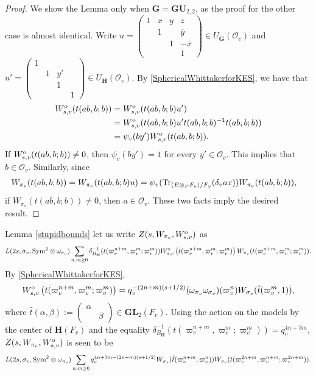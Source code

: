 \documentclass[11pt, reqno]{amsart}
\theoremstyle{plain}
\theoremstyle{definition}
\theoremstyle{remark}
\theoremstyle{plain}
\def\H{{H}}
\def\G{\mathbf{G}}
\def\H{\mathbf{H}}
\def\GU{{\mathbf{GU}}}
\def\GL{\mathbf{GL}}
\begin{document}
\begin{proof} 
We show the Lemma only when $\G = \GU_{2,2}$, as the proof for the other case is almost identical. Write $u = \left(\begin{smallmatrix}1&x &y &z \\ &1 & & \overline{y}\\ & &1&-\overline{x} \\ & & & 1\end{smallmatrix}\right) \in U_{{\G}}(\mathcal{O}_v)$ and $u' = \left(\begin{smallmatrix}1& & & \\ &1 &y' & \\ & &1& \\ & & & 1\end{smallmatrix}\right)\in U_{\H}(\mathcal{O}_v)$. By \eqref{SphericalWhittakerforKES}, we have that 
\begin{align*}
W_{s,v}^{\rm o}(t(ab,b;b)) &= W_{s,v}^{\rm o}(t(ab,b;b)u') \\ 
&= W_{s,v}^{\rm o}(t(ab,b;b)u't(ab,b;b)^{-1} t(ab,b;b)) \\ 
&= \psi_v(b y')W_{s,v}^{\rm o}(t(ab,b;b)).
\end{align*}  
If $W_{s,v}^{\rm o}(t(ab,b;b)) \ne 0$, then $\psi_v(b y')=1$ for every $y' \in \mathcal{O}_v$. This implies that $b \in \mathcal{O}_v$. Similarly, since
\begin{align*}
W_{\pi_v}(t(ab,b;b)) &= W_{\pi_v}(t(ab,b;b)u) = \psi_v({\rm Tr}_{(E \otimes_F F_v)/F_v}(\delta_v a x))W_{\pi_v}(t(ab,b;b)), 
\end{align*}  
if $W_{\pi_v}(t(ab,b;b)) \ne 0$, then $a \in \mathcal{O}_v$. These two facts imply the desired result.
\end{proof}
\noindent Lemma \ref{stupidbounds} let us write $Z(s,W_{\pi_v},W_{s,v}^{\rm o})$ as
\begin{align*} L(2s, \sigma_v, {\rm Sym}^2\otimes \omega_{\pi_v} )  \sum_{n,m \geq 0} \delta_{B_\H}^{-1}(t(\varpi_v^{n+m},\varpi_v^m;\varpi_v^m))W_{s,v}^{\rm o}\left(t(\varpi_v^{n+m},\varpi_v^m;\varpi_v^m)\right)W_{\pi_v}(t(\varpi_v^{n+m},\varpi_v^m;\varpi_v^m)).\end{align*}
By \eqref{SphericalWhittakerforKES}, 
\[W_{s,v}^{\rm o}\left(t(\varpi_v^{n+m},\varpi_v^m;\varpi_v^m)\right) = q_v^{-(2n+m)(s+1/2)} (\omega_{\pi_v}\omega_{\sigma_v})(\varpi_v^n) W_{\sigma_v}(\hat{t}(\varpi_v^m,1)),\]
where $\hat{t}(\alpha,\beta) := \left(\begin{smallmatrix} \alpha& \\ & \beta \end{smallmatrix}\right)\in \GL_2(F_v)$. Using the action on the models by the center of $\H(F_v)$ and the equality $\delta_{B_\H}^{-1}(t(\varpi_v^{n+m},\varpi_v^m;\varpi_v^m)) = q_v^{4n+3m}$,   $Z(s,W_{\pi_v},W_{s,v}^{\rm o})$ is seen to be  
\begin{align}\label{WhittakerLocalExpr} L(2s, \sigma_v, {\rm Sym}^2\otimes \omega_{\pi_v} )   \sum_{n,m \geq 0} q_v^{4n+3m-(2n+m)(s+1/2)} W_{\sigma_v}(\hat{t}(\varpi_v^{n+m},\varpi_v^{n}))W_{\pi_v}(t(\varpi_v^{2n+m},\varpi_v^{n+m};\varpi_v^{2n+m})).\end{align}
\end{document}
